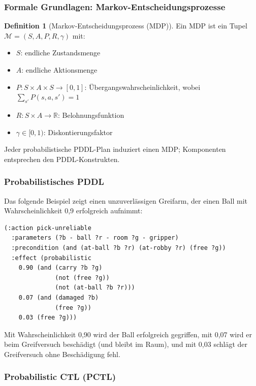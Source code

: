 ﻿\documentclass[a4paper,12pt]{article}
\theoremstyle{definition}
\newtheorem{definition}{Definition}[section]
\begin{document}
\subsubsection{Formale Grundlagen: Markov-Entscheidungsprozesse}

\begin{definition}[Markov-Entscheidungsprozess (MDP)]
Ein MDP ist ein Tupel $\mathcal{M} = (S, A, P, R, \gamma)$ mit:
\begin{itemize}
  \item[-] $S$: endliche Zustandsmenge
  \item[-] $A$: endliche Aktionsmenge
  \item[-] $P: S \times A \times S \to [0,1]$: Übergangswahrscheinlichkeit, wobei $\sum_{s'} P(s,a,s') = 1$
  \item[-] $R: S \times A \to \mathbb{R}$: Belohnungsfunktion
  \item[-] $\gamma \in [0,1)$: Diskontierungsfaktor
\end{itemize}
\end{definition}

Jeder probabilistische PDDL-Plan induziert
einen MDP; Komponenten entsprechen den PDDL-Konstrukten.

\subsubsection{Probabilistisches PDDL}

Das folgende Beispiel zeigt einen unzuverlässigen Greifarm, der einen Ball mit Wahrscheinlichkeit 0,9 erfolgreich aufnimmt:

\begin{lstlisting}[language=PDDL, caption=Probabilistischer PDDL-Operator]
(:action pick-unreliable
  :parameters (?b - ball ?r - room ?g - gripper)
  :precondition (and (at-ball ?b ?r) (at-robby ?r) (free ?g))
  :effect (probabilistic
    0.90 (and (carry ?b ?g)
              (not (free ?g))
              (not (at-ball ?b ?r)))
    0.07 (and (damaged ?b)
              (free ?g))
    0.03 (free ?g)))
\end{lstlisting}

Mit Wahrscheinlichkeit 0,90 wird der Ball erfolgreich gegriffen, mit 0,07 wird er beim Greifversuch beschädigt (und bleibt im Raum), und mit 0,03 schlägt der Greifversuch ohne Beschädigung fehl.

\subsubsection{Probabilistic CTL (PCTL)}
\end{document}

